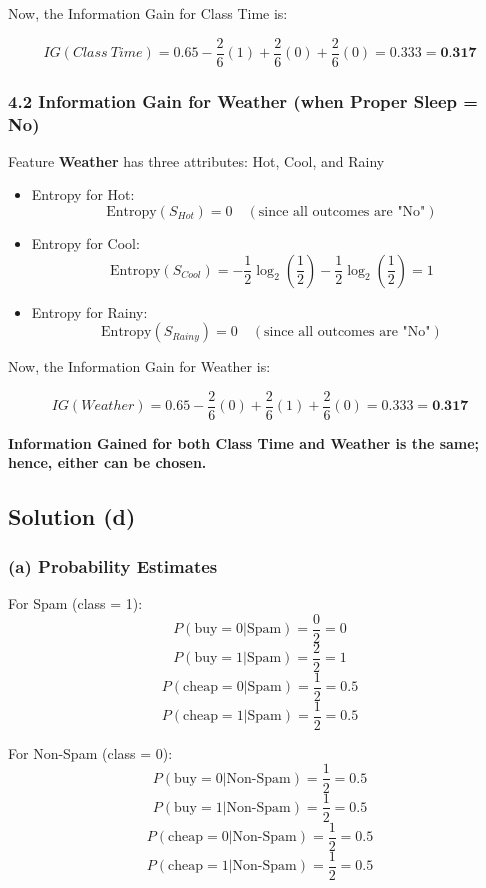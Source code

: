 \documentclass{article}
\begin{document}
Now, the Information Gain for Class Time is:

\[
IG(Class \ Time) = 0.65 - \frac{2}{6}(1) + \frac{2}{6}(0) + \frac{2}{6}(0) = 0.333 = \textbf{0.317}
\]

\subsubsection*{4.2 Information Gain for Weather (when Proper Sleep = No)}
Feature \textbf{Weather} has three attributes: Hot, Cool, and Rainy

\begin{itemize}
\item Entropy for Hot:
\[
\text{Entropy}(S_{Hot}) = 0 \quad (\text{since all outcomes are "No"})
\]

\item Entropy for Cool:
\[
\text{Entropy}(S_{Cool}) = -\frac{1}{2} \log_2\left(\frac{1}{2}\right) - \frac{1}{2} \log_2\left(\frac{1}{2}\right) = 1
\]

\item Entropy for Rainy:
\[
\text{Entropy}(S_{Rainy}) = 0 \quad (\text{since all outcomes are "No"})
\]
\end{itemize}

Now, the Information Gain for Weather is:

\[
IG(Weather) = 0.65 - \frac{2}{6}(0) + \frac{2}{6}(1) + \frac{2}{6}(0) = 0.333 = \textbf{0.317}
\]

\textbf{Information Gained for both Class Time and Weather is the same; hence, either can be chosen.}

\vspace{10pt}
\subsection*{Solution (d)}
\subsubsection*{(a) Probability Estimates}

\hspace{12pt}
For Spam (class = 1):
\[
P(\text{buy} = 0 | \text{Spam}) = \frac{0}{2}  = 0
\]
\[
P(\text{buy} = 1 | \text{Spam}) = \frac{2}{2}  = 1
\]
\[
P(\text{cheap} = 0 | \text{Spam}) = \frac{1}{2}  = 0.5
\]
\[
P(\text{cheap} = 1 | \text{Spam}) = \frac{1}{2}  = 0.5
\]

For Non-Spam (class = 0):
\[
P(\text{buy} = 0 | \text{Non-Spam}) = \frac{1}{2}  = 0.5
\]
\[
P(\text{buy} = 1 | \text{Non-Spam}) = \frac{1}{2}  = 0.5
\]
\[
P(\text{cheap} = 0 | \text{Non-Spam}) = \frac{1}{2}  = 0.5
\]
\[
P(\text{cheap} = 1 | \text{Non-Spam}) = \frac{1}{2}  = 0.5
\]
\end{document}
